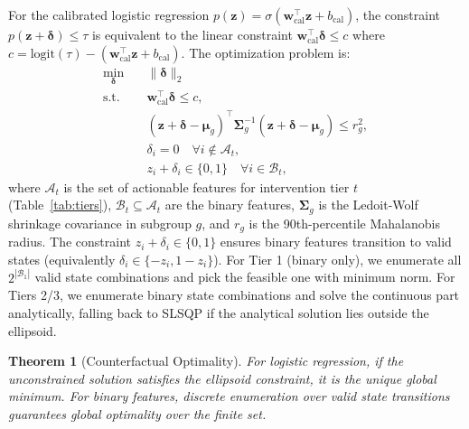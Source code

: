 \documentclass[11pt,a4paper]{article}
\theoremstyle{plain}
\newtheorem{theorem}{Theorem}
\begin{document}
For the calibrated logistic regression $p(\mathbf{z}) = \sigma(\mathbf{w}_{\text{cal}}^\top \mathbf{z} + b_{\text{cal}})$, the constraint $p(\mathbf{z}+\boldsymbol{\delta}) \le \tau$ is equivalent to the linear constraint $\mathbf{w}_{\text{cal}}^\top \boldsymbol{\delta} \le c$ where $c = \text{logit}(\tau) - (\mathbf{w}_{\text{cal}}^\top \mathbf{z} + b_{\text{cal}})$. The optimization problem is:
\begin{equation}
\begin{aligned}
\min_{\boldsymbol{\delta}} &\quad \|\boldsymbol{\delta}\|_2 \\
\text{s.t.} &\quad \mathbf{w}_{\text{cal}}^\top \boldsymbol{\delta} \le c, \\
&\quad (\mathbf{z} + \boldsymbol{\delta} - \boldsymbol{\mu}_g)^\top \boldsymbol{\Sigma}_g^{-1} (\mathbf{z} + \boldsymbol{\delta} - \boldsymbol{\mu}_g) \le r_g^2, \\
&\quad \delta_i = 0 \quad \forall i \notin \mathcal{A}_t, \\
&\quad z_i + \delta_i \in \{0,1\} \quad \forall i \in \mathcal{B}_t,
\end{aligned}
\end{equation}
where $\mathcal{A}_t$ is the set of actionable features for intervention tier $t$ (Table~\ref{tab:tiers}), $\mathcal{B}_t \subseteq \mathcal{A}_t$ are the binary features, $\boldsymbol{\Sigma}_g$ is the Ledoit-Wolf shrinkage covariance \citep{ledoit2004well} in subgroup $g$, and $r_g$ is the 90th-percentile Mahalanobis radius. The constraint $z_i + \delta_i \in \{0,1\}$ ensures binary features transition to valid states (equivalently $\delta_i \in \{-z_i, 1-z_i\}$). For Tier 1 (binary only), we enumerate all $2^{|\mathcal{B}_1|}$ valid state combinations and pick the feasible one with minimum norm. For Tiers 2/3, we enumerate binary state combinations and solve the continuous part analytically, falling back to SLSQP if the analytical solution lies outside the ellipsoid.

\begin{theorem}[Counterfactual Optimality]
For logistic regression, if the unconstrained solution satisfies the ellipsoid constraint, it is the unique global minimum. For binary features, discrete enumeration over valid state transitions guarantees global optimality over the finite set.
\end{theorem}
\end{document}
